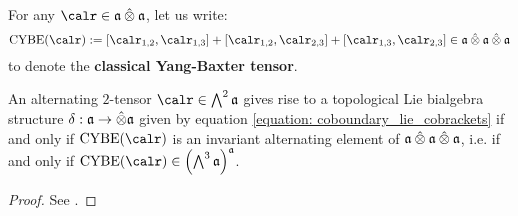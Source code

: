 \begin{lemma}[Drinfeld] \label{lemma: coboundary_lie_bialgebras_and_CYBEs}
    For any $\calr \in \a \hattensor \a$, let us write:
        \begin{equation} \label{equation: classical_yang_baxter_tensor}
            \CYBE(\calr) := [\calr_{1, 2}, \calr_{1, 3}] + [\calr_{1, 2}, \calr_{2, 3}] + [\calr_{1, 3}, \calr_{2, 3}] \in \a \hattensor \a \hattensor \a
        \end{equation}
    to denote the \textbf{classical Yang-Baxter tensor}. 

    An alternating $2$-tensor $\calr \in \bigwedge^2 \a$ gives rise to a topological Lie bialgebra structure $\delta: \a \to \hattensor \a$ given by equation \eqref{equation: coboundary_lie_cobrackets} if and only if $\CYBE(\calr)$ is an invariant alternating element of $\a \hattensor \a \hattensor \a$, i.e. if and only if $\CYBE(\calr) \in \left( \bigwedge^3 \a \right)^{\a}$.
\end{lemma}
    \begin{proof}
        See \cite[Theorem 3.1]{etingof_schiffmann_lectures_on_quantum_groups}.
    \end{proof}

